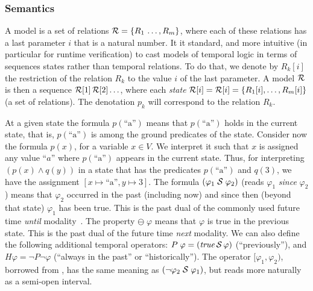 \subsubsection{Semantics} 

A model is a set of
 relations ${\cal R} = \{ R_1 \, \ldots , R_m \}$, where each of these relations has a last parameter $i$ that is a natural number. 
% 
It it standard, and more intuitive (in particular for runtime verification) to cast models of temporal logic in terms of sequences states rather than temporal relations. To do that,
 we denote by $R_k [ i ]$ the restriction of
 the relation $R_k$ to the value $i$ of the last parameter. A model ${\cal R}$ is then a sequence ${\cal R} [ 1 ]\, {\cal R} [ 2 ] \ldots$, where
 each {\em state} ${\cal R} [ i ] = {\cal R} [i] = \{ R_1 [i], \ldots , R_m [ i ] \}$  (a set of relations).
 The denotation $p_k$ will correspond to the relation $R_k$.


\iffalse
At a given state the formula
$p(\text{``a''})$ means that $p (\text{``a''} )$ holds
in the current state,
that is, $p (\text{``a''} )$ is among 
the ground predicates of the state.
Consider now the formula $p ( x )$, for a variable $x \in V$.
We interpret it such that $x$ is assigned any value ``$a$'' where
$p ( \text{``a''} )$ appears in the current state. 
Thus, for interpreting $(p ( x ) \wedge q ( y ))$ in a state that
has the predicates
$p ( \text{``a''} )$ and $q ( 3 )$,
we have the assignment $[ x \mapsto \text{``a''} , y \mapsto 3 ]$.
The formula $(\varphi_1\; {\cal S}\; \varphi_2)$ 
(reads $\varphi_1$ {\em since} $\varphi_2$)
means that $\varphi_2$ occurred in the past (including now)
and since then (beyond that state) $\varphi_1$ has been true. This is the 
past dual of the commonly used %
future time  {\em until} modality~\cite{MP}. 
The property $\ominus \; \varphi$ means that $\varphi$ is true 
in the previous state.
This is the past dual of the %
future time {\em next} modality.
We can also define the following additional temporal operators:
$P \; \varphi = (\mathit{true} \, {\cal S} \, \varphi)$ (``previously''),
and $H \varphi = \neg P \neg \varphi$ (``always in the past'' or ``historically'').
The operator $[\varphi_1,\varphi_2)$, borrowed from \cite{MaC}, 
has the same meaning as $(\neg \varphi_2\; {\cal S}\; \varphi_1)$, but reads more naturally as
a semi-open interval. 



